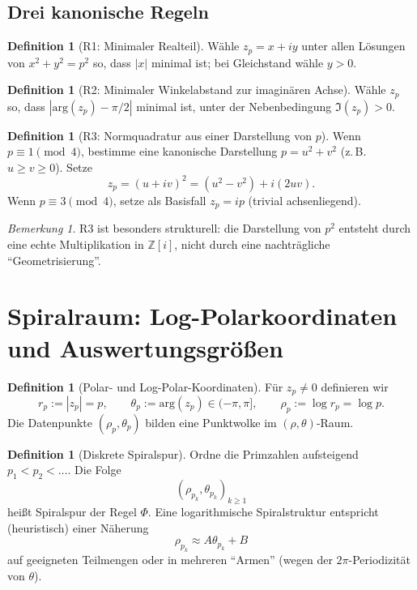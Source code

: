 \documentclass[a4paper,11pt]{article}
\theoremstyle{definition}
\newtheorem{definition}[satz]{Definition}
\theoremstyle{remark}
\newtheorem{bemerkung}[satz]{Bemerkung}
\newcommand{\Zi}{\mathbb{Z}[i]}
\newcommand{\Arg}{\mathrm{arg}}
\begin{document}
	\subsection{Drei kanonische Regeln}
	\begin{definition}[R1: Minimaler Realteil]
		Wähle \(z_p=x+iy\) unter allen Lösungen von \(x^2+y^2=p^2\) so, dass \(|x|\) minimal ist; bei Gleichstand wähle \(y>0\).
	\end{definition}
	
	\begin{definition}[R2: Minimaler Winkelabstand zur imaginären Achse]
		Wähle \(z_p\) so, dass \(|\Arg(z_p)-\pi/2|\) minimal ist, unter der Nebenbedingung \(\Im(z_p)>0\).
	\end{definition}
	
	\begin{definition}[R3: Normquadratur aus einer Darstellung von \(p\)]
		Wenn \(p\equiv 1\pmod4\), bestimme eine kanonische Darstellung \(p=u^2+v^2\) (z.\,B.\ \(u\ge v\ge 0\)).
		Setze
		\[
		z_p=(u+iv)^2=(u^2-v^2)+i(2uv).
		\]
		Wenn \(p\equiv 3\pmod4\), setze als Basisfall \(z_p=ip\) (trivial achsenliegend).
	\end{definition}
	
	\begin{bemerkung}
		R3 ist besonders strukturell: die Darstellung von \(p^2\) entsteht durch eine echte Multiplikation in \(\Zi\),
		nicht durch eine nachträgliche ``Geometrisierung''.
	\end{bemerkung}
	
	\section{Spiralraum: Log-Polarkoordinaten und Auswertungsgrößen}
	\begin{definition}[Polar- und Log-Polar-Koordinaten]
		Für \(z_p\neq 0\) definieren wir
		\[
		r_p:=|z_p|=p,\qquad \theta_p:=\Arg(z_p)\in(-\pi,\pi],\qquad \rho_p:=\log r_p=\log p.
		\]
		Die Datenpunkte \((\rho_p,\theta_p)\) bilden eine Punktwolke im \((\rho,\theta)\)-Raum.
	\end{definition}
	
	\begin{definition}[Diskrete Spiralspur]
		Ordne die Primzahlen aufsteigend \(p_1<p_2<\dots\). Die Folge
		\[
		(\rho_{p_k},\theta_{p_k})_{k\ge 1}
		\]
		heißt Spiralspur der Regel \(\Phi\).
		Eine logarithmische Spiralstruktur entspricht (heuristisch) einer Näherung
		\[
		\rho_{p_k}\approx A\theta_{p_k}+B
		\]
		auf geeigneten Teilmengen oder in mehreren ``Armen'' (wegen der \(2\pi\)-Periodizität von \(\theta\)).
	\end{definition}
	
\end{document}
